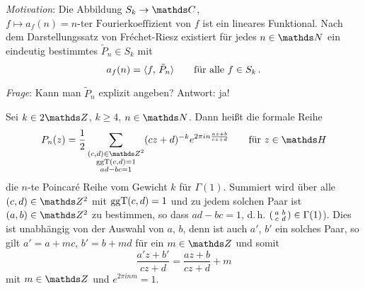 \emph{Motivation}: Die Abbildung $S_k \ra \CC$, $f \mapsto a_f(n) = \text{$n$-ter Fourierkoeffizient von $f$}$ ist ein lineares Funktional.
Nach dem Darstellungssatz von Fréchet-Riesz existiert für jedes $n \in \NN$ ein eindeutig bestimmtes $\tilde P_n \in S_k$ mit
\[
	a_f(n) = \scalarprd f{\tilde P_n} \qquad \text{für alle } f\in S_k\,.
\]

\emph{Frage}: Kann man $\tilde P_n$ explizit angeben? Antwort: ja!

\begin{defi}
	Sei $k \in 2\ZZ$, $k \geq 4$, $n\in\NN$. Dann heißt die formale Reihe
	\[
		P_n(z)
		= \frac{1}{2} \sum_{\substack{(c,d)\in\ZZ^2 \\ \ggt(c,d) = 1 \\ ad-bc = 1}} (cz+d)^{-k} e^{2\pi in \frac{az+b}{cz+d}}
		\qquad \text{für } z \in \HH
	\]
	die $n$-te Poincaré Reihe vom Gewicht $k$ für $\Gamma(1)$.
	Summiert wird über alle $(c,d) \in \ZZ^2$ mit $\operatorname{ggT}(c,d) = 1$ und zu jedem solchen Paar ist $(a,b) \in \ZZ^2$ zu bestimmen, so dass $ad-bc = 1$, d.\,h. $\abcd \in \Gamma(1)$).
	Dies ist unabhängig von der Auswahl von $a$, $b$, denn ist auch $a'$, $b'$ ein solches Paar, so gilt $a' = a+mc$, $b' = b + md$ für ein $m \in \ZZ$ und somit
	\[
		\frac{a'z+b'}{cz+d} = \frac{az+b}{cz + d} + m
	\]
	mit $m \in \ZZ$ und $e^{2\pi inm} = 1$.
\end{defi}